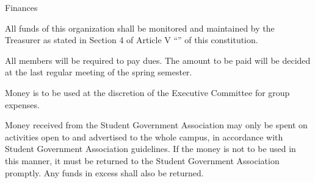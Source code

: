 {
	\begin{article}{Finances}
		\item All funds of this organization shall be monitored and maintained by the Treasurer as stated in Section 4 of Article V \enquote{} of this constitution.
		\item All members will be required to pay dues.  The amount to be paid will be decided at the last regular meeting of the spring semester.
		\item Money is to be used at the discretion of the Executive Committee for group expenses.
		\item Money received from the Student Government Association may only be spent on activities open to and advertised to the whole campus, in accordance with Student Government Association guidelines.  If the money is not to be used in this manner, it must be returned to the Student Government Association promptly.  Any funds in excess shall also be returned.
	\end{article}
}